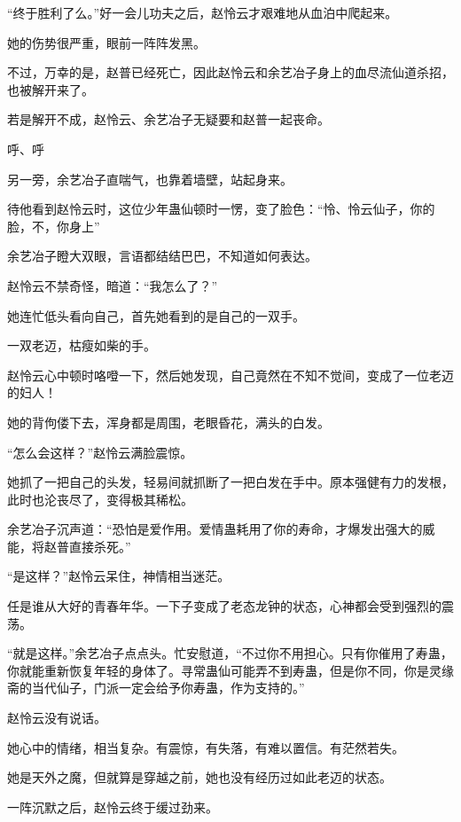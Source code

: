 
\begin{this_body}



“终于胜利了么。”好一会儿功夫之后，赵怜云才艰难地从血泊中爬起来。

她的伤势很严重，眼前一阵阵发黑。

不过，万幸的是，赵普已经死亡，因此赵怜云和余艺冶子身上的血尽流仙道杀招，也被解开来了。

若是解开不成，赵怜云、余艺冶子无疑要和赵普一起丧命。

呼、呼

另一旁，余艺冶子直喘气，也靠着墙壁，站起身来。

待他看到赵怜云时，这位少年蛊仙顿时一愣，变了脸色：“怜、怜云仙子，你的脸，不，你身上”

余艺冶子瞪大双眼，言语都结结巴巴，不知道如何表达。

赵怜云不禁奇怪，暗道：“我怎么了？”

她连忙低头看向自己，首先她看到的是自己的一双手。

一双老迈，枯瘦如柴的手。

赵怜云心中顿时咯噔一下，然后她发现，自己竟然在不知不觉间，变成了一位老迈的妇人！

她的背佝偻下去，浑身都是周围，老眼昏花，满头的白发。

“怎么会这样？”赵怜云满脸震惊。

她抓了一把自己的头发，轻易间就抓断了一把白发在手中。原本强健有力的发根，此时也沦丧尽了，变得极其稀松。

余艺冶子沉声道：“恐怕是爱作用。爱情蛊耗用了你的寿命，才爆发出强大的威能，将赵普直接杀死。”

“是这样？”赵怜云呆住，神情相当迷茫。

任是谁从大好的青春年华。一下子变成了老态龙钟的状态，心神都会受到强烈的震荡。

“就是这样。”余艺冶子点点头。忙安慰道，“不过你不用担心。只有你催用了寿蛊，你就能重新恢复年轻的身体了。寻常蛊仙可能弄不到寿蛊，但是你不同，你是灵缘斋的当代仙子，门派一定会给予你寿蛊，作为支持的。”

赵怜云没有说话。

她心中的情绪，相当复杂。有震惊，有失落，有难以置信。有茫然若失。

她是天外之魔，但就算是穿越之前，她也没有经历过如此老迈的状态。

一阵沉默之后，赵怜云终于缓过劲来。


\end{this_body}
